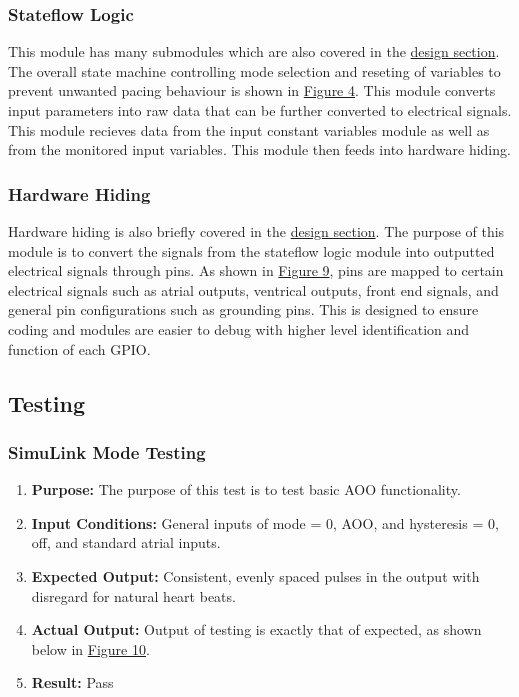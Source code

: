 \documentclass{article}
\newcounter{subsubsubsection}[subsubsection]
\begin{document}
\subsubsection{Stateflow Logic}
This module has many submodules which are also covered in the \hyperref[dessec]{design section}. The overall state machine controlling 
mode selection and reseting of variables to prevent unwanted pacing behaviour is shown in \hyperref[StateMod]{Figure 4}. This module 
converts input parameters into raw data that can be further converted to electrical signals. This module recieves data 
from the input constant variables module as well as from the monitored input variables. This module then feeds into 
hardware hiding. 

\subsubsection{Hardware Hiding}
Hardware hiding is also briefly covered in the \hyperref[dessec]{design section}. The purpose of this module is 
to convert the signals from the stateflow logic module into outputted electrical signals through pins. As shown in 
\hyperref[HardHide]{Figure 9}, pins are mapped to certain electrical signals such as atrial outputs, ventrical outputs, 
front end signals, and general pin configurations such as grounding pins. This is designed to ensure coding and modules 
are easier to debug with higher level identification and function of each GPIO. 

\newpage
\subsection{Testing}

\subsubsection{SimuLink Mode Testing}


\begin{enumerate}[label=]
   \item \textbf{Purpose:} The purpose of this test is to test basic AOO functionality.
   \item \textbf{Input Conditions:} General inputs of mode = 0, AOO, and hysteresis = 0, off, and standard 
   atrial inputs. 
   \item \textbf{Expected Output:} Consistent, evenly spaced pulses in the output with disregard for natural heart beats.
   \item \textbf{Actual Output:} Output of testing is exactly that of expected, as shown below in \hyperref[AOOtest]{Figure 10}.
   \item \textbf{Result:} Pass
\end{enumerate}
\end{document}
